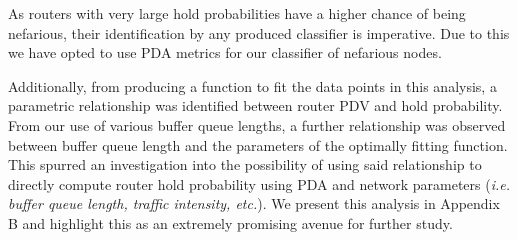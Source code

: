 As routers with very large hold probabilities have a higher chance of being nefarious, their identification by any produced classifier is imperative. Due to this we have opted to use PDA metrics for our classifier of nefarious nodes.\par
Additionally, from producing a function to fit the data points in this analysis, a parametric relationship was identified between router PDV and hold probability. From our use of various buffer queue lengths, a further relationship was observed between buffer queue length and the parameters of the optimally fitting function. This spurred an investigation into the possibility of using said relationship to directly compute router hold probability using PDA and network parameters (\textit{i.e. buffer queue length, traffic intensity, etc.}). We present this analysis in Appendix B and highlight this as an extremely promising avenue for further study.

